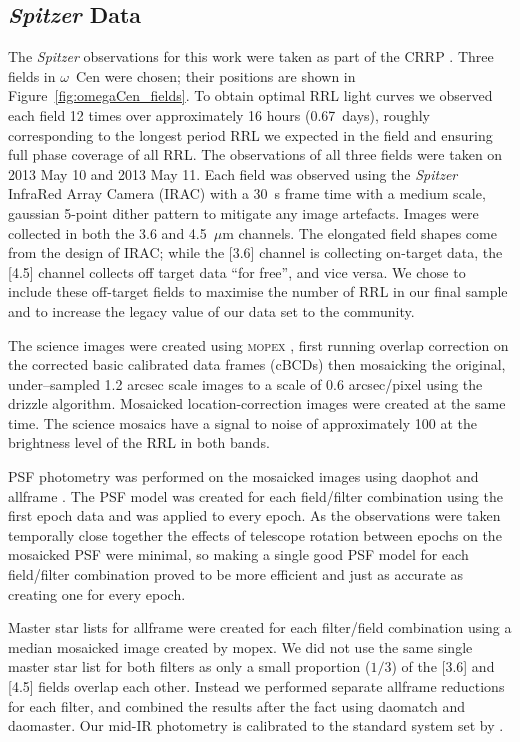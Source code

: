 \documentclass[a4paper,fleqn,usenatbib]{mnras}
\newcommand{\ocen}{$\omega$~Cen\xspace}
\newcommand{\um}{~$\mu$m\xspace}
\begin{document}
\subsection{{\em Spitzer} Data}
\label{sec:spitzer_reduction}
The \textit{Spitzer} observations for this work were taken as part of the CRRP \citet[][{\it Spitzer} PID 90002]{2012sptz.prop90002F}. Three fields in \ocen were chosen; their positions are shown in Figure~\ref{fig:omegaCen_fields}. To obtain optimal RRL light curves we observed each field 12 times over approximately 16 hours (0.67~days), roughly corresponding to the longest period RRL we expected in the field and ensuring full phase coverage of all RRL. The observations of all three fields were taken on 2013 May 10 and 2013 May 11. Each field was observed using the {\it Spitzer} InfraRed Array Camera (IRAC) \citep{2004ApJS..154...10F} with a 30~s frame time with a medium scale, gaussian 5-point dither pattern to mitigate any image artefacts. Images were collected in both the 3.6 and 4.5\um channels. 
The elongated field shapes come from the design of IRAC; while the [3.6] channel is collecting on-target data, the [4.5] channel collects off target data ``for free'', and vice versa. We chose to include these off-target fields to maximise the number of RRL in our final sample and to increase the legacy value of our data set to the community. 

The science images were created using \textsc{mopex} \citep{2006SPIE.6274E..0CM}, first running overlap correction on the corrected basic calibrated data frames (cBCDs) then mosaicking the original, under--sampled 1.2 arcsec scale images to a scale of 0.6 arcsec/pixel using the drizzle algorithm. Mosaicked location-correction images were created at the same time. The science mosaics have a signal to noise of approximately 100 at the brightness level of the RRL in both bands. 

PSF photometry was performed on the mosaicked images using {\sc daophot} and {\sc allframe} \citep{1987PASP...99..191S, 1994PASP..106..250S}. The PSF model was created for each field/filter combination using the first epoch data and was applied to every epoch. As the observations were taken temporally close together the effects of telescope rotation between epochs on the mosaicked PSF were minimal, so making a single good PSF model for each field/filter combination proved to be more efficient and just as accurate as creating one for every epoch. 

Master star lists for {\sc allframe} were created for each filter/field combination using a median mosaicked image created by {\sc mopex}. We did not use the same single master star list for both filters as only a small proportion ($1/3$) of the [3.6] and [4.5] fields overlap each other. Instead we performed separate {\sc allframe} reductions for each filter, and combined the results after the fact using {\sc daomatch} and {\sc daomaster}. Our mid-IR photometry is calibrated to the standard system set by \citet{2005PASP..117..978R}.
\end{document}
